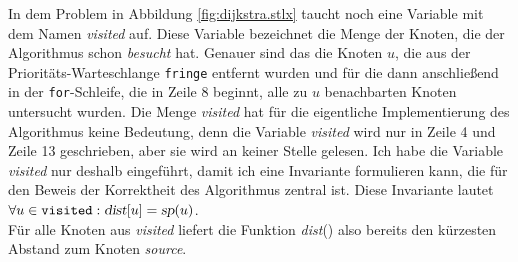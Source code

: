 In dem Problem in Abbildung \ref{fig:dijkstra.stlx} taucht noch eine Variable mit dem Namen \textsl{visited} auf.
Diese Variable bezeichnet die Menge der Knoten, die der Algorithmus schon \textsl{besucht}
hat.  Genauer sind das die Knoten $u$, die aus der Priorit\"ats-Warteschlange \texttt{fringe}
entfernt wurden und f\"ur die dann anschlie{\ss}end in der \texttt{for}-Schleife, die in Zeile 8
beginnt, alle zu $u$ benachbarten Knoten untersucht wurden.  
Die Menge \textsl{visited} hat f\"ur
die eigentliche Implementierung des Algorithmus keine Bedeutung, denn die Variable \textsl{visited}
wird nur in Zeile 4 und Zeile 13 geschrieben, aber sie wird an keiner Stelle gelesen.
Ich habe die Variable \textsl{visited} nur deshalb eingef\"uhrt, damit ich eine Invariante formulieren
kann, die f\"ur den Beweis der Korrektheit des Algorithmus zentral ist.  Diese Invariante lautet
\\[0.2cm]
\hspace*{1.3cm}
$\forall u\in\mathtt{visited}: \textsl{dist}[u] = \textsl{sp}(u)$.
\\[0.2cm]
F\"ur alle Knoten aus \textsl{visited} liefert die Funktion \textsl{dist}() also bereits den
k\"urzesten Abstand zum Knoten \textsl{source}.  
\vspace*{0.1cm}

